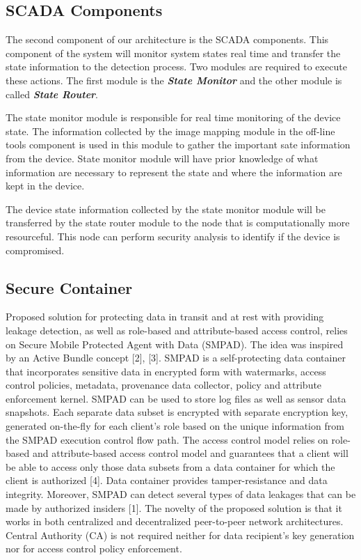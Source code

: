 \documentclass[conference]{IEEEtran}
\begin{document}
\subsection{SCADA Components}
The second component of our architecture is the SCADA components. This component of the system will monitor system states real time and transfer the state information to the detection process. Two modules are required to execute these actions. The first module is the \textit{\textbf{State Monitor}} and the other module is called \textit{\textbf{State Router}}.
\par The state monitor module is responsible for real time monitoring of the device state. The information collected by the image mapping module in the off-line tools component is used in this module to gather the important sate information from the device. State monitor module will have prior knowledge of what information are necessary to represent the state and where the information are kept in the device. 
\par The device state information collected by the state monitor module will be transferred by the state router module to the node that is computationally more resourceful. This node can perform security analysis to identify if the device is compromised.
\subsection{Secure Container}
Proposed solution for protecting data in transit and at rest with providing leakage detection, as well as role-based and attribute-based access control, relies on Secure Mobile Protected Agent with Data (SMPAD). The idea was inspired by an Active Bundle concept [2], [3]. SMPAD is a self-protecting data container that incorporates sensitive data in encrypted form with watermarks, access control policies, metadata, provenance data collector, policy and attribute enforcement kernel. SMPAD can be used to store log files as well as sensor data snapshots. Each separate data subset is encrypted with separate encryption key, generated on-the-fly for each client’s role based on the unique information from the SMPAD execution control flow path. The access control model relies on role-based and attribute-based access control model and guarantees that a client will be able to access only those data subsets from a data container for which the client is authorized [4]. Data container provides tamper-resistance and data integrity. Moreover, SMPAD can detect several types of data leakages that can be made by authorized insiders [1]. The novelty of the proposed solution is that it works in both centralized and decentralized peer-to-peer network architectures. Central Authority (CA) is not required neither for data recipient’s key generation nor for access control policy enforcement.
\end{document}
